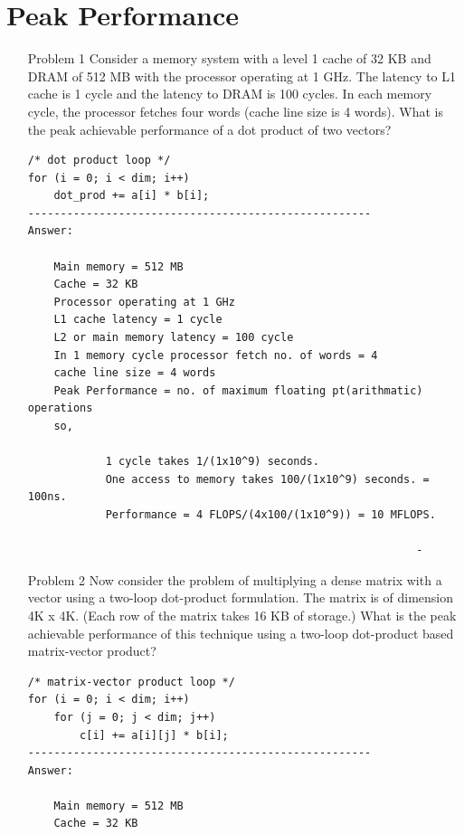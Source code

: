 \documentclass{sem5}
\author{Dilip Puri}
\begin{document}
\section*{Peak Performance}
\begin{enumerate}
\item[Problem 1] Consider a memory system with a level 1 cache of 32 KB and DRAM of 512 MB with the processor operating at 1 GHz. The latency to L1 cache is 1 cycle and the latency to DRAM is 100 cycles. In each memory cycle, the processor fetches four words (cache line size is 4 words). What is the peak achievable performance of a dot product of two vectors?
\lstset{language=C}
\begin{lstlisting}[frame=single]
/* dot product loop */
for (i = 0; i < dim; i++)
	dot_prod += a[i] * b[i];
-----------------------------------------------------
Answer:

	Main memory = 512 MB
	Cache = 32 KB
	Processor operating at 1 GHz
	L1 cache latency = 1 cycle
	L2 or main memory latency = 100 cycle
	In 1 memory cycle processor fetch no. of words = 4
	cache line size = 4 words
	Peak Performance = no. of maximum floating pt(arithmatic) operations
	so,
		
			1 cycle takes 1/(1x10^9) seconds.
			One access to memory takes 100/(1x10^9) seconds. = 100ns.
			Performance = 4 FLOPS/(4x100/(1x10^9)) = 10 MFLOPS.
			
															-
\end{lstlisting}
\item[Problem 2] Now consider the problem of multiplying a dense matrix with a vector using a two-loop dot-product formulation. The matrix is of dimension 4K x 4K. (Each row of the matrix takes 16 KB of storage.) What is the peak achievable performance of this technique using a two-loop dot-product based matrix-vector product?
\lstset{language=C}
\begin{lstlisting}[frame=single]
/* matrix-vector product loop */
for (i = 0; i < dim; i++)
	for (j = 0; j < dim; j++)
		c[i] += a[i][j] * b[i];
-----------------------------------------------------
Answer:

	Main memory = 512 MB
	Cache = 32 KB

\end{lstlisting}
\end{enumerate}
\end{document}
